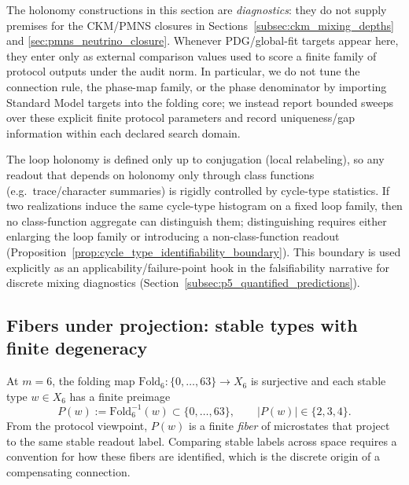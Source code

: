 \begin{remark}\label{rem:holonomy_diagnostic_status}
The holonomy constructions in this section are \emph{diagnostics}: they do not supply premises for the CKM/PMNS closures in Sections~\ref{subsec:ckm_mixing_depths} and \ref{sec:pmns_neutrino_closure}.
Whenever PDG/global-fit targets appear here, they enter only as external comparison values used to score a finite family of protocol outputs under the audit norm.
In particular, we do not tune the connection rule, the phase-map family, or the phase denominator by importing Standard Model targets into the folding core; we instead report bounded sweeps over these explicit finite protocol parameters and record uniqueness/gap information within each declared search domain.
\end{remark}

\begin{remark}\label{rem:holonomy_identifiability_boundary}
\AuditTag The loop holonomy is defined only up to conjugation (local relabeling), so any readout that depends on holonomy only through class functions (e.g.\ trace/character summaries) is rigidly controlled by cycle-type statistics.
If two realizations induce the same cycle-type histogram on a fixed loop family, then no class-function aggregate can distinguish them; distinguishing requires either enlarging the loop family or introducing a non-class-function readout (Proposition~\ref{prop:cycle_type_identifiability_boundary}).
This boundary is used explicitly as an applicability/failure-point hook in the falsifiability narrative for discrete mixing diagnostics (Section~\ref{subsec:p5_quantified_predictions}).
\end{remark}

\subsection{Fibers under projection: stable types with finite degeneracy}
\label{subsec:fiber_under_projection}

At $m=6$, the folding map $\mathrm{Fold}_6:\{0,\dots,63\}\to X_6$ is surjective and each stable type $w\in X_6$ has a finite preimage
\[
P(w):=\mathrm{Fold}_6^{-1}(w)\subset\{0,\dots,63\},
\qquad |P(w)|\in\{2,3,4\}.
\]
From the protocol viewpoint, $P(w)$ is a finite \emph{fiber} of microstates that project to the same stable readout label.
Comparing stable labels across space requires a convention for how these fibers are identified, which is the discrete origin of a compensating connection.

